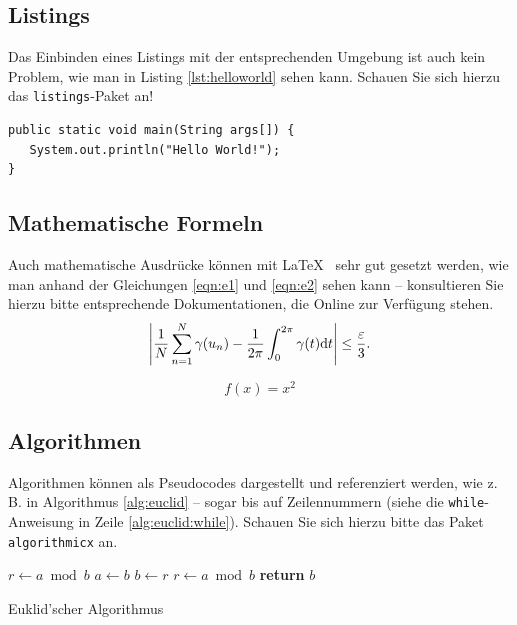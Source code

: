 \subsection{Listings}	

Das Einbinden eines Listings mit der entsprechenden Umgebung ist auch kein Problem, wie man in Listing \vref{lst:helloworld} sehen kann. Schauen Sie sich hierzu das \texttt{listings}-Paket an! 
		
		\newpage
		
		
\lstset{language=Java}
\begin{lstlisting}[caption={Hello World!}, label={lst:helloworld}]
public static void main(String args[]) {
   System.out.println("Hello World!");
}
\end{lstlisting}


\subsection{Mathematische Formeln}
Auch mathematische Ausdrücke können mit \LaTeX~ sehr gut gesetzt werden, wie man anhand der Gleichungen \vref{eqn:e1} und \vref{eqn:e2} sehen kann -- konsultieren Sie hierzu bitte entsprechende Dokumentationen, die Online zur Verfügung stehen.
\begin{equation}
\left|{1\over N}\sum_{n=1}^N \gamma(u_n)-{1\over 2\pi}\int_0^{2\pi}\gamma(t){\rm d}t\right| \le {\varepsilon\over 3}.\\
\label{eqn:e1}
\end{equation}

\begin{equation}
f(x)=x^2
\label{eqn:e2}
\end{equation}


\subsection{Algorithmen}
Algorithmen können als Pseudocodes dargestellt und referenziert werden, wie z.\,B. in Algorithmus \vref{alg:euclid} -- sogar bis auf Zeilennummern
(siehe die \texttt{while}-Anweisung in Zeile \vref{alg:euclid:while}). Schauen Sie sich hierzu bitte das Paket \texttt{algorithmicx} an.



\begin{algorithm}
\begin{algorithmic}[1]
   \State $r\gets a\bmod b$
    \label{alg:euclid:while}
      \State $a\gets b$
      \State $b\gets r$
      \State $r\gets a\bmod b$
   \EndWhile\label{euclidendwhile}
   \State \textbf{return} $b$
\EndProcedure
\end{algorithmic}
\caption{Euklid'scher Algorithmus}\label{alg:euclid}
\end{algorithm}


